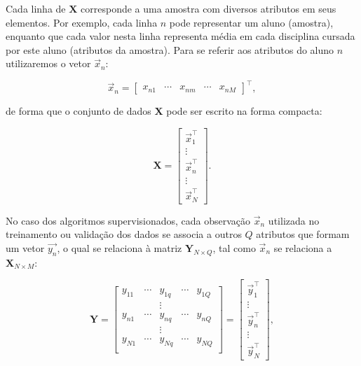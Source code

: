     Cada linha de $\boldsymbol{X}$ corresponde a uma amostra com diversos atributos em seus elementos. Por exemplo, cada linha $n$ pode representar um aluno (amostra), enquanto que cada valor nesta linha representa média em cada disciplina cursada por este aluno (atributos da amostra). Para se referir aos atributos do aluno $n$ utilizaremos o vetor $\vec{x}_n$:

    \begin{equation} \label{e:x_n}
      \vec{x}_n = \begin{bmatrix} x_{n1} & \cdots & x_{nm} & \cdots & x_{nM} \end{bmatrix}^{\top}
      ,
    \end{equation}

    \noindent de forma que o conjunto de dados $\boldsymbol{X}$ pode ser escrito na forma compacta:

    \begin{equation} \label{e:X_compacta}
      \boldsymbol{X} = \begin{bmatrix}
        \vec{x}_1^{\top} \\
        \vdots \\
        \vec{x}_n^{\top} \\
        \vdots \\
        \vec{x}_N^{\top}
      \end{bmatrix}
      .
    \end{equation}

    No caso dos algoritmos supervisionados, cada observação $\vec{x}_n$ utilizada no treinamento ou validação dos dados se associa a outros $Q$ atributos
que formam um vetor $\vec{y_n}$, o qual se relaciona à matriz $\boldsymbol{Y}_{N \times Q}$, tal como $\vec{x}_n$ se relaciona a $\boldsymbol{X}_{N \times M}$:

    \begin{equation} \label{e:Y}
      \boldsymbol{Y} = \begin{bmatrix}
            y_{11} & \cdots & y_{1q} & \cdots & y_{1Q} \\
                   & & \vdots & &       \\
            y_{n1} & \cdots & y_{nq} & \cdots & y_{nQ} \\
                   & & \vdots & &       \\
            y_{N1} & \cdots & y_{Nq} & \cdots & y_{NQ} \\
          \end{bmatrix}
        = \begin{bmatrix}
            \vec{y}_1^{\top} \\
            \vdots \\
            \vec{y}_n^{\top} \\
            \vdots \\
            \vec{y}_N^{\top}
          \end{bmatrix}
          ,
    \end{equation}

